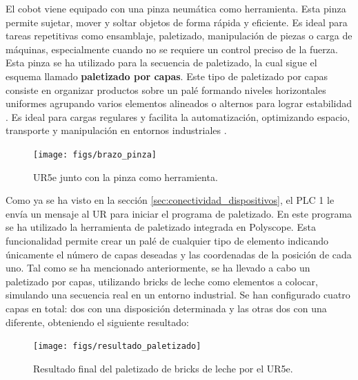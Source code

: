El cobot viene equipado con una pinza neumática como herramienta. Esta pinza permite sujetar, mover y soltar objetos de forma rápida y eficiente. Es ideal para tareas repetitivas como ensamblaje, paletizado, manipulación de piezas o carga de máquinas, especialmente cuando no se requiere un control preciso de la fuerza. Esta pinza se ha utilizado para la secuencia de paletizado, la cual sigue el esquema llamado \textbf{paletizado por capas}. Este tipo de paletizado por capas consiste en organizar productos sobre un palé formando niveles horizontales uniformes agrupando varios elementos alineados o alternos para lograr estabilidad \cite{paletizado_capas}. Es ideal para cargas regulares y facilita la automatización, optimizando espacio, transporte y manipulación en entornos industriales \cite{paletizado_capas}. 

\begin{figure}[h!]
  \begin{center}
  	\texttt{[image: figs/brazo\_pinza]}
  \end{center}
  \caption{\centering UR5e junto con la pinza como herramienta.}
  \label{fig:brazo_pinza}
\end{figure}

Como ya se ha visto en la sección \ref{sec:conectividad_dispositivos}, el PLC 1 le envía un mensaje al UR para iniciar el programa de paletizado. En este programa se ha utilizado la herramienta de paletizado integrada en Polyscope. Esta funcionalidad permite crear un palé de cualquier tipo de elemento indicando únicamente el número de capas deseadas y las coordenadas de la posición de cada uno. Tal como se ha mencionado anteriormente, se ha llevado a cabo un paletizado por capas, utilizando bricks de leche como elementos a colocar, simulando una secuencia real en un entorno industrial. Se han configurado cuatro capas en total: dos con una disposición determinada y las otras dos con una diferente, obteniendo el siguiente resultado:

\begin{figure}[h!]
  \begin{center}
  	\texttt{[image: figs/resultado\_paletizado]}
  \end{center}
  \caption{\centering Resultado final del paletizado de bricks de leche por el UR5e.}
  \label{fig:resultado_paletizado}
\end{figure}

